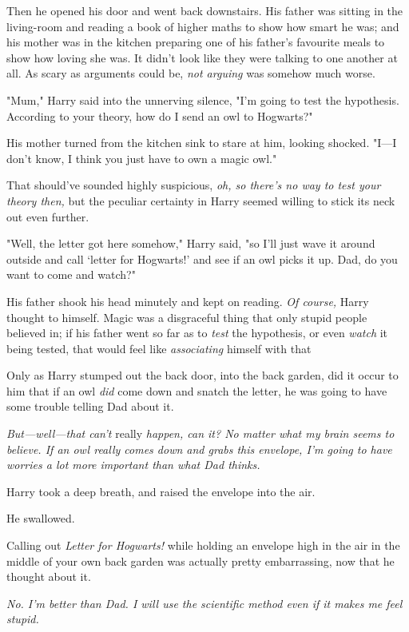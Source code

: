 Then he opened his door and went back downstairs. His father was sitting in the
living-room and reading a book of higher maths to show how smart he was; and
his mother was in the kitchen preparing one of his father's favourite meals to
show how loving she was. It didn't look like they were talking to one another
at all. As scary as arguments could be, \emph{not arguing} was somehow much
worse.

"Mum," Harry said into the unnerving silence, "I'm going to test the
hypothesis. According to your theory, how do I send an owl to Hogwarts?"

His mother turned from the kitchen sink to stare at him, looking shocked.
"I---I don't know, I think you just have to own a magic owl."

That should've sounded highly suspicious, \emph{oh, so there's no way to test
your theory then,} but the peculiar certainty in Harry seemed willing to stick
its neck out even further.

"Well, the letter got here somehow," Harry said, "so I'll just wave it around
outside and call `letter for Hogwarts!' and see if an owl picks it up. Dad, do
you want to come and watch?"

His father shook his head minutely and kept on reading. \emph{Of course,} Harry
thought to himself. Magic was a disgraceful thing that only stupid people
believed in; if his father went so far as to \emph{test} the hypothesis, or
even \emph{watch} it being tested, that would feel like \emph{associating}
himself with that{\el}

Only as Harry stumped out the back door, into the back garden, did it occur to
him that if an owl \emph{did} come down and snatch the letter, he was going to
have some trouble telling Dad about it.

\emph{But---well---that can't} really \emph{happen, can it? No matter what my
brain seems to believe. If an owl really comes down and grabs this envelope,
I'm going to have worries a lot more important than what Dad thinks.}

Harry took a deep breath, and raised the envelope into the air.

He swallowed.

Calling out \emph{Letter for Hogwarts!} while holding an envelope high in the
air in the middle of your own back garden was{\el} actually pretty
embarrassing, now that he thought about it.

\emph{No. I'm better than Dad. I will use the scientific method even if it
makes me feel stupid.}

